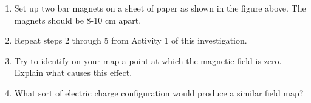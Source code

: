 \begin{enumerate}
\item Set up two bar magnets on a sheet of paper as shown in the figure
above. The magnets should be 8-10 cm apart.
\item Repeat steps 2 through 5 from Activity 1 of this investigation.
\item Try to identify on your map a point at which the magnetic field is
zero. Explain what causes this effect.\vspace{30mm}

\item What sort of electric charge configuration would produce a similar
field map?\vspace{15mm}
\end{enumerate}

